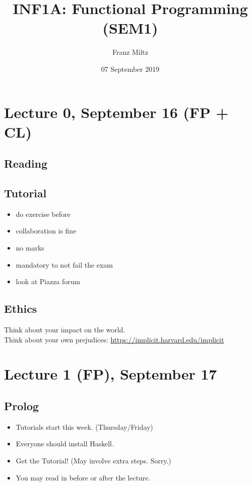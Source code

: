 \documentclass{article}
\begin{document}
\title{INF1A: Functional Programming (SEM1)}
\author{Franz Miltz}
\date{07 September 2019}
\maketitle
\tableofcontents
\pagebreak
\section{Lecture 0, September 16 (FP + CL)}
\subsection{Reading}
\subsection{Tutorial}
\begin{itemize}
	\item do exercise before
	\item collaboration is fine
	\item no marks
	\item mandatory to not fail the exam
\end{itemize}
\begin{itemize}
	\item look at Piazza forum
\end{itemize}
\subsection{Ethics}
Think about your impact on the world.\\
Think about your own prejudices:
\url{https://implicit.harvard.edu/implicit}
\section{Lecture 1 (FP), September 17}
\subsection{Prolog}
\begin{itemize}
	\item Tutorials start this week. (Thursday/Friday)
	\item Everyone should install Haskell.
	\item Get the Tutorial! (May involve extra steps. Sorry.)
	\item You may read in before or after the lecture.
\end{itemize}
\end{document}

